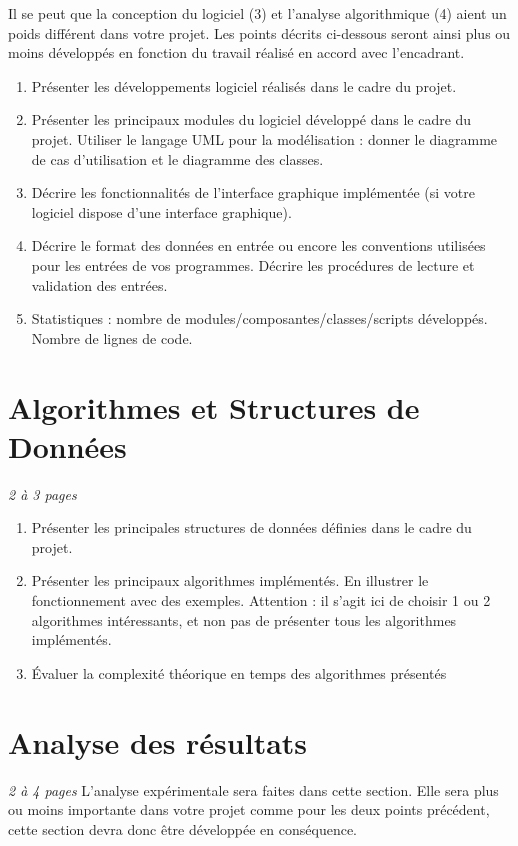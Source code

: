 \documentclass[a4paper]{article}
\begin{document}
Il se peut que la conception du logiciel (3) et l'analyse algorithmique (4) aient un poids différent dans votre projet. Les points décrits ci-dessous seront ainsi plus ou moins développés en fonction du travail réalisé en accord avec l'encadrant. 
\begin{enumerate}%
\item Présenter les développements logiciel réalisés dans le cadre du projet.
\item Présenter les principaux modules du logiciel développé dans le cadre du projet. Utiliser le langage UML pour la modélisation : donner le diagramme de cas d'utilisation et le diagramme des classes.
\item Décrire les fonctionnalités de l'interface graphique implémentée (si votre logiciel dispose d'une interface graphique).
\item Décrire le format des données en entrée ou encore les conventions utilisées pour les entrées de vos programmes. Décrire les procédures de lecture et validation des entrées.
\item Statistiques : nombre de modules/composantes/classes/scripts développés. Nombre de lignes de code.
\end{enumerate}

\section{Algorithmes et Structures de Données}
\emph{2 à 3 pages}
\begin{enumerate}%
\item 	Présenter les principales structures de données définies dans le cadre du projet.
\item 	Présenter les principaux algorithmes implémentés. En illustrer le fonctionnement avec des exemples. Attention : il s'agit ici de choisir 1 ou 2 algorithmes intéressants, et non pas de présenter tous les algorithmes implémentés.
\item 	Évaluer la complexité théorique en temps des algorithmes présentés
\end{enumerate}

\section{Analyse des résultats }
\emph{2 à 4 pages}
L'analyse expérimentale sera faites dans cette section.   Elle sera plus ou moins importante dans votre projet comme pour les deux points précédent, cette section devra donc être développée en conséquence.
\end{document}
